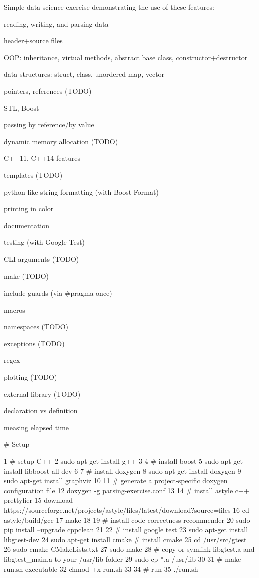 Simple data science exercise demonstrating the use of these features\+:


\begin{DoxyItemize}
\item reading, writing, and parsing data
\item header+source files
\item O\+OP\+: inheritance, virtual methods, abstract base class, constructor+destructor
\item data structures\+: struct, class, unordered map, vector
\item pointers, references (T\+O\+DO)
\item S\+TL, Boost
\item passing by reference/by value
\item dynamic memory allocation (T\+O\+DO)
\item C++11, C++14 features
\item templates (T\+O\+DO)
\item python like string formatting (with Boost Format)
\item printing in color
\item documentation
\item testing (with Google Test)
\item C\+LI arguments (T\+O\+DO)
\item make (T\+O\+DO)
\item include guards (via \#pragma once)
\item macros
\item namespaces (T\+O\+DO)
\item exceptions (T\+O\+DO)
\item regex
\item plotting (T\+O\+DO)
\item external library (T\+O\+DO)
\item declaration vs definition
\item measing elapsed time
\end{DoxyItemize}

\# Setup 
\begin{DoxyCode}
1 # setup C++
2 sudo apt-get install g++
3 
4 # install boost
5 sudo apt-get install libboost-all-dev
6 
7 # install doxygen
8 sudo apt-get install doxygen
9 sudo apt-get install graphviz
10 
11 # generate a project-specific doxygen configuration file
12 doxygen -g parsing-exercise.conf
13 
14 # install astyle c++ prettyfier
15 download https://sourceforge.net/projects/astyle/files/latest/download?source=files
16 cd astyle/build/gcc
17 make
18 
19 # install code correctness recommender
20 sudo pip install --upgrade cppclean
21 
22 # install google test
23 sudo apt-get install libgtest-dev
24 sudo apt-get install cmake # install cmake
25 cd /usr/src/gtest
26 sudo cmake CMakeLists.txt
27 sudo make
28 # copy or symlink libgtest.a and libgtest\_main.a to your /usr/lib folder
29 sudo cp *.a /usr/lib
30 
31 # make run.sh executable
32 chmod +x run.sh
33 
34 # run
35 ./run.sh
\end{DoxyCode}


